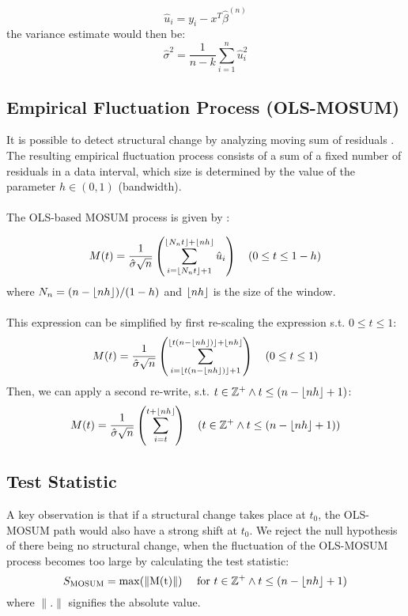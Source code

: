 \documentclass[main.tex]{subfiles}
\begin{document}
\begin{equation} \label{eq:residuals}
\hat{u}_i = y_i - x^T\hat{\beta}^{(n)}
\end{equation}
the variance estimate would then be:
\begin{equation} \label{eq:sigma}
\hat{\sigma}^{2}=\frac{1}{n-k} \sum_{i=1}^{n} \hat{u}_{i}^{2}
\end{equation}

\subsection{Empirical Fluctuation Process (OLS-MOSUM)}
\label{subsec:empirical_fluctuation}
It is possible to detect structural change by analyzing moving sum of residuals
\cite{strucchange}. The resulting empirical fluctuation process consists of a
sum of a fixed number of residuals in a data interval, which size is determined
by the value of the parameter $h \in (0,1)$ (bandwidth). \\\\
The OLS-based MOSUM process is given by \cite{mosum_tests}:

\begin{equation}\label{eq:mosum_og}
M(t)=\frac{1}{\hat{\sigma} \sqrt{n}}
\left(\sum_{i=\lfloor N_{n} t\rfloor+1}^{\left\lfloor N_{n} t\right\rfloor+\lfloor
  n h\rfloor} \hat{u}_{i}\right) \quad(0 \leq t \leq 1-h)
\end{equation}
where $N_{n}=(n-\lfloor n h\rfloor) /(1-h)$ and $\lfloor n h\rfloor$ is the size of the
window. \\\\
This expression can be simplified by first re-scaling the
expression s.t. $0 \leq t \leq 1$:
\begin{equation}
  M(t) =
  \frac{1}{\hat{\sigma} \sqrt{n}}
  \left(\sum_{i=\lfloor t(n - \lfloor nh\rfloor)\rfloor + 1}^{\lfloor t(n - \lfloor nh\rfloor)\rfloor + \lfloor nh\rfloor}\right)
  \quad(0 \leq t \leq 1)
\end{equation}
Then, we can apply a second re-write, s.t.
$t \in \mathbb{Z}^+ \wedge t \leq (n - \lfloor nh\rfloor + 1)$:
\begin{equation} \label{eq:mosum}
  M(t) =
  \frac{1}{\hat{\sigma} \sqrt{n}}
  \left(\sum_{i=t}^{t + \lfloor nh\rfloor}\right)
  \quad(t \in \mathbb{Z}^+ \wedge t \leq (n - \lfloor nh\rfloor + 1))
\end{equation}

\subsection{Test Statistic}
\label{subsec:test_statistic}
A key observation is that if a structural change takes place at $t_0$, the
OLS-MOSUM path would also have a strong shift at $t_0$.
We reject the null hypothesis of there being no structural change, when the fluctuation of
the OLS-MOSUM process becomes too large by calculating the test statistic:
\begin{equation} \label{eq:test_statistic}
  S_{\text{MOSUM}} = \max(\|\text{M(t)}\|) \quad \text{ for } t \in \mathbb{Z}^+ \wedge t \leq (n - \lfloor nh\rfloor + 1)
\end{equation}
where $\| . \|$ signifies the absolute value.
\end{document}

